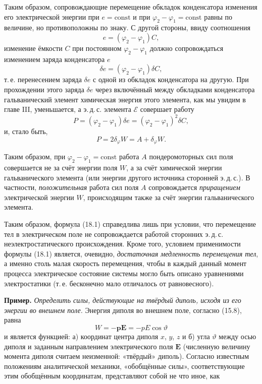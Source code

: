 \documentclass[a4paper,10pt]{article}
\begin{document}
Таким образом, сопровождающие перемещение обкладок конденсатора
изменения его электрической энергии при $e = \text{const}$ и при
$\varphi_2 - \varphi_1 = \text{const}$ равны по величине, но
противоположны по знаку. С другой стороны, ввиду соотношения
$$
    e = (\varphi_2 - \varphi_1)C,
$$
изменение ёмкости $C$ при постоянном $\varphi_2 - \varphi_1$ должно
сопровождаться изменением заряда конденсатора $e$
$$
    \delta e = (\varphi_2 - \varphi_1)\delta C,
$$
т.\,е. перенесением заряда $\delta e$ с одной из обкладок конденсатора
на другую. При прохождении этого заряда $\delta e$ через включённый
между обкладками конденсатора гальванический элемент химическая энергия
этого элемента, как мы увидим в главе III, уменьшается, а э.\,д.\,с.
элемента $\mathcal{E}$ совершает работу
$$
    P = (\varphi_2 - \varphi_1)\delta e = (\varphi_2 - \varphi_1)^2\delta C,
$$
и, стало быть,
\begin{equation}
    P = 2\delta_\varphi W = A + \delta_\varphi W.
    \tag{18.5}
\end{equation}


Таким образом, при $\varphi_2 - \varphi_1 = \text{const}$ работа $A$
пондеромоторных сил поля совершается не за счёт энергии поля $W$,
а за счёт химической энергии гальванического элемента (или энергии
другого источника сторонней э.\,д.\,с.). В частности, \textit{положительная}
работа сил поля $A$ сопровождается \textit{приращением} электрической
энергии $W$, происходящим также за счёт энергии гальванического элемента.

Таким образом, формула (18.1) справедлива лишь при условии, что
перемещение тел в электрическом поле не сопровождается работой
сторонних э.\,д.\,с. неэлектростатического происхождения. Кроме того,
условием применимости формулы (18.1) является, очевидно, \textit{достаточная
медленность перемещения тел}, а именно столь малая скорость перемещения,
чтобы в каждый данный момент процесса электрическое состояние системы
могло быть описано уравнениями электростатики (т.\,е. бесконечно мало
отличалось от равновесного).

\medskip
\noindent\textbf{Пример.} \textit{Определить силы, действующие на твёрдый
диполь, исходя из его энергии во внешнем поле.} Энергия диполя во
внешнем поле, согласно (15.8), равна
$$
    W = -\mathbf{p}\mathbf{E} = -pE\cos\vartheta
$$
и является функцией: а) координат центра диполя $x$, $y$, $z$ и б)
угла $\vartheta$ между осью диполя и заданным направлением электрического
поля $\mathbf{E}$ (численную величину момента диполя считаем
неизменной: «твёрдый» диполь). Согласно известным положениям
аналитической механики, «обобщённые силы», соответствующие этим
обобщённым координатам, представляют собой не что иное, как
\end{document}
